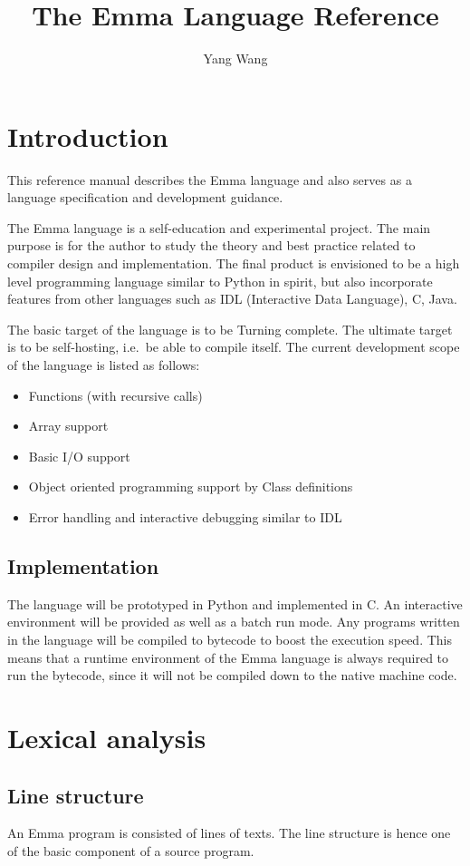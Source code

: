 \documentclass[10pt,a4paper]{article}
\author{Yang Wang}
\title{The Emma Language Reference}
\begin{document}
\section{Introduction}
This reference manual describes the Emma language and also serves as a  
language specification and development guidance.

The Emma language is a self-education and experimental project. 
The main purpose is for the author to study the theory and best practice related
to compiler design and implementation. 
The final product is envisioned to be a high level programming language similar
to Python in spirit, but also incorporate features from other languages such as
IDL (Interactive Data Language), C, Java. 

The basic target of the language is to be Turning complete. The ultimate
target is to be self-hosting, i.e.\ be able to compile itself.
The current development scope of the language is listed as follows:

\begin{itemize}
\item Functions (with recursive calls)
\item Array support
\item Basic I/O support
\item Object oriented programming support by Class definitions
\item Error handling and interactive debugging similar to IDL
\end{itemize}


\subsection{Implementation}
The language will be prototyped in Python and implemented in C. 
An interactive environment will be provided as well as a batch
run mode. Any programs written in the language will be compiled
to bytecode to boost the execution speed. This means
that a runtime environment of the Emma language is always required to run
the bytecode, since it will not be compiled down to the native machine
code.

\pagebreak

\section{Lexical analysis}
\subsection{Line structure}
An Emma program is consisted of lines of texts. The line structure is
hence one of the basic component of a source program.
\end{document}
